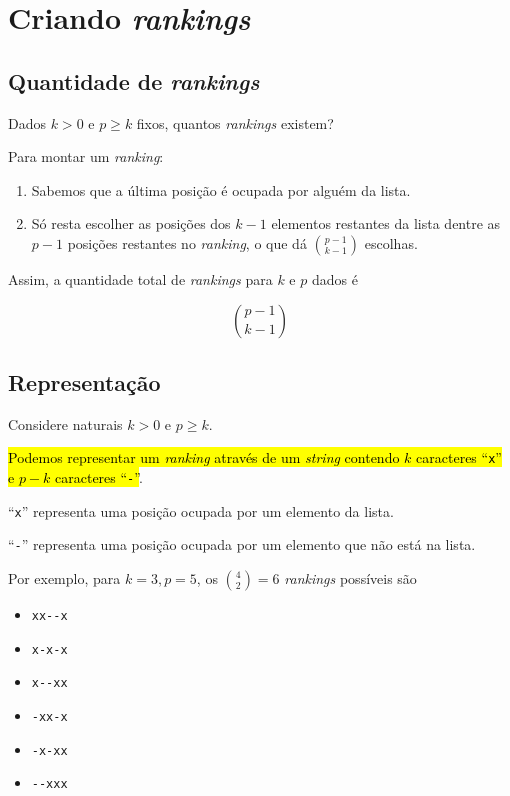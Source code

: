 \documentclass[
  letterpaper,
  DIV=11,
  numbers=noendperiod]{scrreprt}
\providecommand{\tightlist}{%
  \setlength{\itemsep}{0pt}\setlength{\parskip}{0pt}}\usepackage{longtable,booktabs,array}
\begin{document}
\section{\texorpdfstring{Criando
\emph{rankings}}{Criando rankings}}\label{criando-rankings}

\subsection{\texorpdfstring{Quantidade de
\emph{rankings}}{Quantidade de rankings}}\label{quantidade-de-rankings}

Dados $k > 0$ e $p \geq k$ fixos, quantos \emph{rankings} existem?

Para montar um \emph{ranking}:

\begin{enumerate}
\def\labelenumi{\arabic{enumi}.}
\item
  Sabemos que a última posição é ocupada por alguém da lista.
\item
  Só resta escolher as posições dos $k - 1$ elementos restantes da lista
  dentre as $p - 1$ posições restantes no \emph{ranking}, o que dá
  $\binom{p - 1}{k - 1}$ escolhas.
\end{enumerate}

Assim, a quantidade total de \emph{rankings} para $k$ e $p$ dados é

\[
\binom{p - 1}{k - 1}
\]

\subsection{Representação}\label{sec-repr}

Considere naturais $k > 0$ e $p \geq k$.

{\hl{Podemos representar um \emph{ranking} através de um \emph{string}
contendo $k$ caracteres ``{\mbox{\texttt{x}}}'' e $p - k$ caracteres
``{\mbox{\texttt{-}}}''}}.

``\texttt{x}'' representa uma posição ocupada por um elemento da lista.

``\texttt{-}'' representa uma posição ocupada por um elemento que não
está na lista.

Por exemplo, para $k = 3, p = 5$, os $\binom{4}{2} = 6$ \emph{rankings}
possíveis são

\begin{itemize}
\tightlist
\item
  \texttt{xx-\/-x}
\item
  \texttt{x-x-x}
\item
  \texttt{x-\/-xx}
\item
  \texttt{-xx-x}
\item
  \texttt{-x-xx}
\item
  \texttt{-\/-xxx}
\end{itemize}
\end{document}
